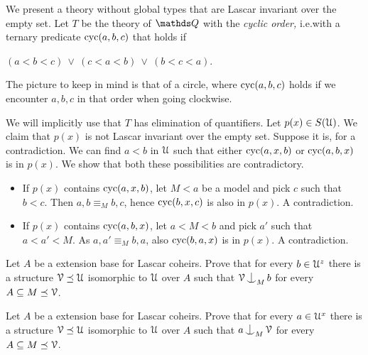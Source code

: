 \begin{example}\label{ex_cyclic_order}
  We present a theory without global types that are Lascar invariant over the empty set.
  Let $T$ be the theory of $\QQ$ with the \emph{cyclic order,} i.e.\@ with a ternary predicate ${\rm cyc}(a, b, c)$ that  holds if

  \hfil $(a < b < c)\ \vee\ (c < a < b)\ \vee\ (b < c < a)$.

  The picture to keep in mind is that of a circle, where ${\rm cyc}(a, b, c)$ holds if we encounter $a,b,c$ in that order when going clockwise.

  We will implicitly use that $T$ has elimination of quantifiers.
  Let $p(x)\in S(\EuScript U)$.
  We claim that $p(x)$ is not Lascar invariant over the empty set.
  Suppose it is, for a contradiction.
  We can find $a<b$ in $\EuScript U$ such that either ${\rm cyc}(a, x, b)$ or ${\rm cyc}(a, b, x)$ is in $p(x)$.
  We show that both these possibilities are contradictory.
  \begin{itemize}
  \item[1.] If $p(x)$ contains ${\rm cyc}(a, x, b)$,
  let $M<a$ be a model and pick $c$ such that $b<c$.
  Then $a, b \equiv_M b, c$, hence ${\rm cyc}(b, x, c)$ is also in $p(x)$.
  A contradiction.
  \item[2.] If $p(x)$ contains ${\rm cyc}(a, b, x)$,
  let $a<M<b$ and pick $a'$ such that $a<a'<M$. 
  As $a, a' \equiv_M b,a$, also  ${\rm cyc}(b, a, x)$ is in $p(x)$.
  A contradiction.
  \end{itemize}
\end{example}

\begin{exercise}
  Let $A$ be a extension base for Lascar coheirs.
  Prove that for every $b\in\EuScript U^z$ there is a structure $\EuScript V\preceq\EuScript U$ isomorphic to $\EuScript U$ over $A$ such that $\V\nonfork_Mb$ for every $A\subseteq M\preceq\EuScript V$.
\end{exercise}

\begin{exercise}
  Let $A$ be a extension base for Lascar coheirs.
  Prove that for every $a\in\EuScript U^x$ there is a structure $\EuScript V\preceq\EuScript U$ isomorphic to $\EuScript U$ over $A$ such that $a\nonfork_M\V$ for every $A\subseteq M\preceq\EuScript V$.
\end{exercise}


